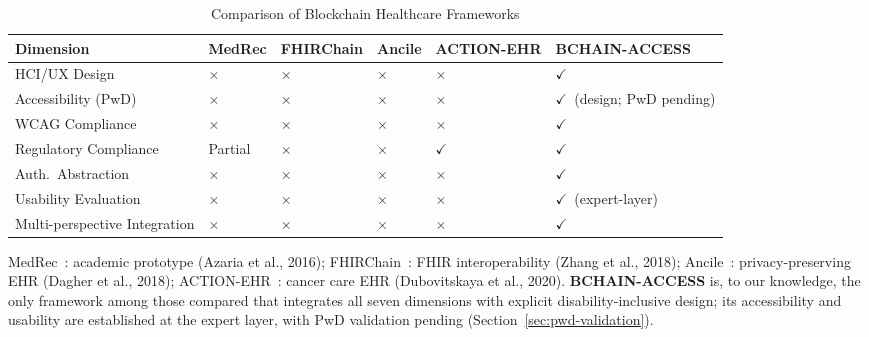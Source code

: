 \documentclass[journal,onecolumn]{IEEEtran}
\begin{document}
\begin{table}[htbp]
\caption{Comparison of Blockchain Healthcare Frameworks}
\label{tab:comparison}
\begin{center}
\small
\begin{adjustbox}{max width=\textwidth}
\begin{tabular}{|p{2.2cm}|p{1.1cm}|p{1.1cm}|p{1.1cm}|p{1.3cm}|p{2.6cm}|}
\hline
\textbf{Dimension} & \textbf{MedRec} & \textbf{FHIRChain} & \textbf{Ancile} & \textbf{ACTION-EHR} & \textbf{BCHAIN-ACCESS} \\
\hline
HCI/UX Design & $\times$ & $\times$ & $\times$ & $\times$ & $\checkmark$ \\
\hline
Accessibility (PwD) & $\times$ & $\times$ & $\times$ & $\times$ & $\checkmark$~(design; PwD pending) \\
\hline
WCAG Compliance & $\times$ & $\times$ & $\times$ & $\times$ & $\checkmark$ \\
\hline
Regulatory Compliance & Partial & $\times$ & $\times$ & $\checkmark$ & $\checkmark$ \\
\hline
Auth.~Abstraction & $\times$ & $\times$ & $\times$ & $\times$ & $\checkmark$ \\
\hline
Usability Evaluation & $\times$ & $\times$ & $\times$ & $\times$ & $\checkmark$~(expert-layer) \\
\hline
Multi-perspective Integration & $\times$ & $\times$ & $\times$ & $\times$ & $\checkmark$ \\
\hline
\end{tabular}
\end{adjustbox}
\end{center}
{\footnotesize MedRec~\cite{medrec}: academic prototype (Azaria et al., 2016);
FHIRChain~\cite{zhang2018fhirchain}: FHIR interoperability (Zhang et al., 2018);
Ancile~\cite{dagher2018ancile}: privacy-preserving EHR (Dagher et al., 2018);
ACTION-EHR~\cite{dubovitskaya2020action}: cancer care EHR (Dubovitskaya et al., 2020).
\textbf{BCHAIN-ACCESS} is, to our knowledge, the only framework among those compared that integrates all seven dimensions with explicit disability-inclusive design; its accessibility and usability are established at the expert layer, with PwD validation pending (Section~\ref{sec:pwd-validation}).}
\end{table}

\end{document}
